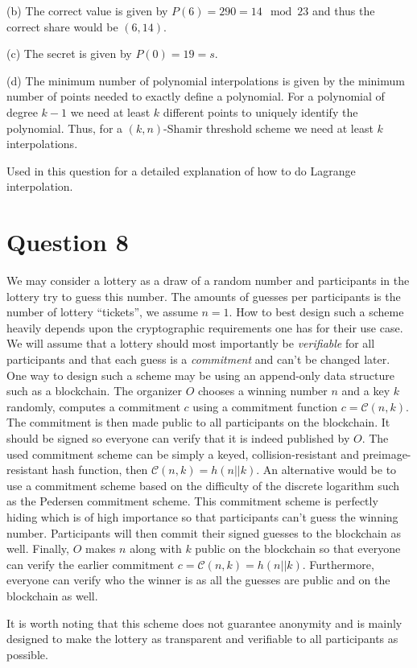 \documentclass[11pt]{article}
\begin{document}
\medskip

\noindent (b) The correct value is given by $P(6) = 290 = 14 \mod 23$ and thus the correct share would be $(6,14)$.

\medskip

\noindent (c) The secret is given by $P(0) = 19 = s$.

\medskip

\noindent (d) The minimum number of polynomial interpolations is given by the minimum number of points needed to exactly define a polynomial. For a polynomial of degree $k-1$ we need at least $k$ different points to uniquely identify the polynomial. Thus, for a $(k,n)$-Shamir threshold scheme we need at least $k$ interpolations. 

\medskip

Used \cite{lagrange} in this question for a detailed explanation of how to do Lagrange interpolation.

\section*{Question 8}

We may consider a lottery as a draw of a random number and participants in the lottery try to guess this number. The amounts of guesses per participants is the number of lottery ``tickets'', we assume $n = 1$. How to best design such a scheme heavily depends upon the cryptographic requirements one has for their use case. We will assume that a lottery should most importantly be \emph{verifiable} for all participants and that each guess is a \emph{commitment} and can't be changed later. One way to design such a scheme may be using an append-only data structure such as a blockchain. The organizer $O$ chooses a winning number $n$ and a key $k$ randomly, computes a commitment $c$ using a commitment function $c = \mathcal{C}(n,k)$. The commitment is then made public to all participants on the blockchain. It should be signed so everyone can verify that it is indeed published by $O$. The used commitment scheme can be simply a keyed, collision-resistant and preimage-resistant hash function, then $\mathcal{C}(n,k) = h(n||k)$. An alternative would be to use a commitment scheme based on the difficulty of the discrete logarithm such as the Pedersen commitment scheme. This commitment scheme is perfectly hiding which is of high importance so that participants can't guess the winning number. Participants will then commit their signed guesses to the blockchain as well. Finally, $O$ makes $n$ along with $k$ public on the blockchain so that everyone can verify the earlier commitment $c = \mathcal{C}(n,k) = h(n||k)$. Furthermore, everyone can verify who the winner is as all the guesses are public and on the blockchain as well.

It is worth noting that this scheme does not guarantee anonymity and is mainly designed to make the lottery as transparent and verifiable to all participants as possible.



\end{document}
